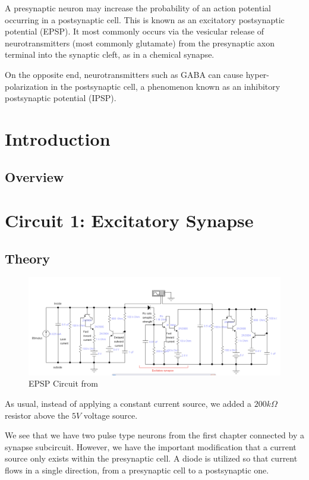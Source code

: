 \documentclass[12]{book}
\newcommand\0{\mathbf{0}}
\newcommand\<{\langle}
\renewcommand\>{\rangle}
\begin{document}
A presynaptic neuron may increase the probability of an action potential occurring in a postsynaptic cell. This is known as an excitatory postsynaptic potential (EPSP). It most commonly occurs via the vesicular release of neurotransmitters (most commonly glutamate) from the presynaptic axon terminal into the synaptic cleft, as in a chemical synapse.

On the opposite end, neurotransmitters such as GABA can cause hyper-polarization in the postsynaptic cell, a phenomenon known as an inhibitory postsynaptic potential (IPSP).

\section{Introduction}

\subsection{Overview}

\section{Circuit 1: Excitatory Synapse}

\subsection{Theory}

\begin{figure}[H]
\centering
\includegraphics[width=\textwidth]{excitatory_circuit}	
\caption{EPSP Circuit from \cite{levitan2015neuron}}
\end{figure}

As usual, instead of applying a constant current source, we added a $200k\Omega$ resistor above the $5V$ voltage source.

We see that we have two pulse type neurons from the first chapter connected by a synapse subcircuit. However, we have the important modification that a current source only exists within the presynaptic cell. A diode is utilized so that current flows in a single direction, from a presynaptic cell to a postsynaptic one.  
\end{document}
